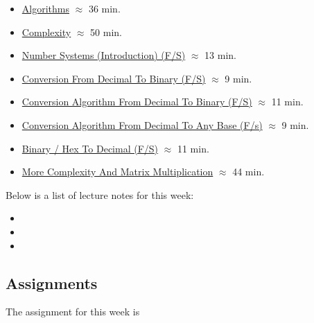 \begin{itemize}
    \item \href{https://applied.cs.colorado.edu/mod/hvp/view.php?id=51632}{Algorithms} $\approx$ 36 min.
    \item \href{https://applied.cs.colorado.edu/mod/hvp/view.php?id=51633}{Complexity} $\approx$ 50 min.
    \item \href{https://applied.cs.colorado.edu/mod/hvp/view.php?id=51634}{Number Systems (Introduction) (F/S)} $\approx$ 13 min.
    \item \href{https://applied.cs.colorado.edu/mod/hvp/view.php?id=51635}{Conversion From Decimal To Binary (F/S)} $\approx$ 9 min.
    \item \href{https://applied.cs.colorado.edu/mod/hvp/view.php?id=51636}{Conversion Algorithm From Decimal To Binary (F/S)} $\approx$ 11 min.
    \item \href{https://applied.cs.colorado.edu/mod/hvp/view.php?id=51637}{Conversion Algorithm From Decimal To Any Base (F/s)} $\approx$ 9 min.
    \item \href{https://applied.cs.colorado.edu/mod/hvp/view.php?id=51638}{Binary / Hex To Decimal (F/S)} $\approx$ 11 min.
    \item \href{https://applied.cs.colorado.edu/mod/hvp/view.php?id=51639}{More Complexity And Matrix Multiplication} $\approx$ 44 min.
\end{itemize}

\noindent Below is a list of lecture notes for this week:

\begin{itemize}
    \item {}
    \item {}
    \item {}
\end{itemize}

\subsection{Assignments}

The assignment for this week is   

